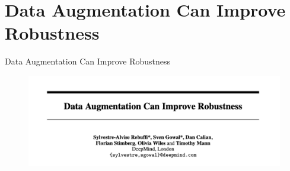 \section{Data Augmentation Can Improve Robustness}

\begin{frame}{Data Augmentation Can Improve Robustness}
    \begin{figure}
        \centering
        \includegraphics[width=\linewidth]{pic/Title.png}
        \label{fig:title}
    \end{figure}
\end{frame}

